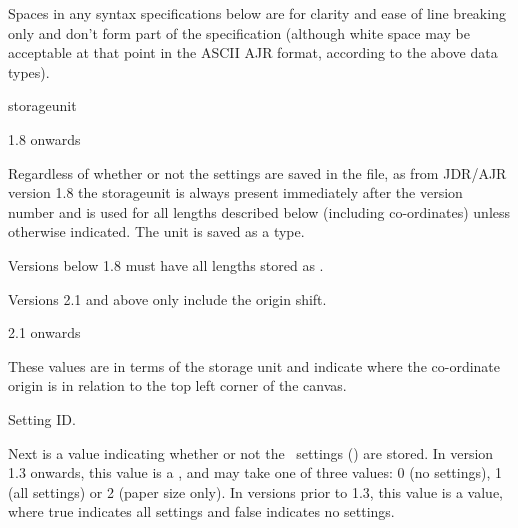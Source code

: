 \begin{important}
Spaces in any syntax specifications below are for clarity and ease
of line breaking only and don't form part of the specification
(although white space may be acceptable at that point in the ASCII
\gls{AJR} format, according to the above data types).
\end{important}

\begin{numbered}

\item \label{jdr:storageunit}\Gls{storageunit}
\begin{jdrversion}{1.8 onwards}
\begin{syntaxline}
\end{syntaxline}
\end{jdrversion}
Regardless of whether or not the settings are saved in the file, as
from JDR/AJR version 1.8 the \gls{storageunit}  is
always present immediately after the version number and is used for
all lengths described below (including \glspl{co-ordinate}) unless
otherwise indicated. The unit is saved as a  type.

Versions below 1.8 must have all lengths stored as
.

\item Versions 2.1 and above only include the origin shift.
\begin{jdrversion}{2.1 onwards}
\begin{syntaxline}
 
\end{syntaxline}
\end{jdrversion}
These values are in terms of the storage unit and indicate where the
co-ordinate origin is in relation to the top left corner of the
\gls{canvas}.

\item\label{jdr:settings-id}Setting ID.
\begin{syntaxline}
\end{syntaxline}
Next is a value  indicating whether or not the
\FlowframTk\ settings () are
stored.
In version 1.3 onwards, this value is a , and may take one of three
values: 0 (no settings), 1 (all settings) or 2 (paper size only).
In versions prior to 1.3, this value is a  value,
where true indicates all settings and false indicates no settings.


\end{numbered}
